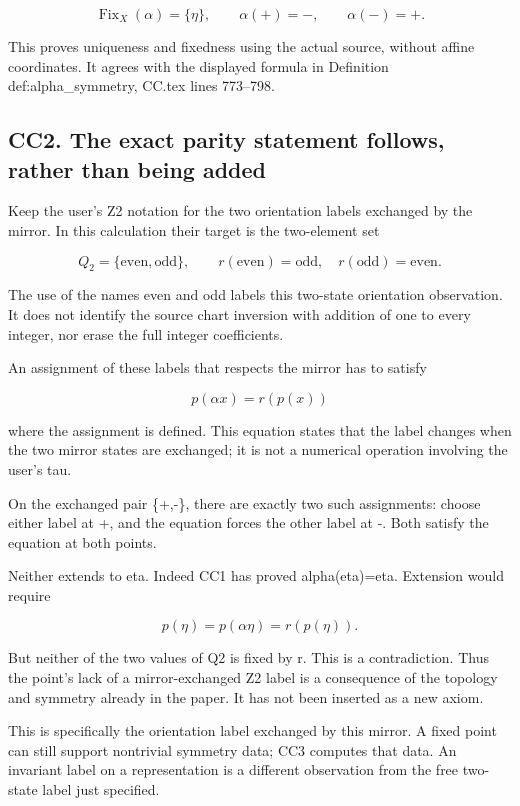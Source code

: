 \documentclass[
  11pt,
]{article}
\begin{document}
\[
\operatorname{Fix}_X(\alpha)=\{\eta\},\qquad
\alpha(+)= -,\qquad\alpha(-)= +.
\]

This proves uniqueness and fixedness using the actual source, without
affine coordinates. It agrees with the displayed formula in Definition
def:alpha\_symmetry, CC.tex lines 773--798.

\subsection{CC2. The exact parity statement follows, rather than being
added}\label{cc2.-the-exact-parity-statement-follows-rather-than-being-added}

Keep the user's Z2 notation for the two orientation labels exchanged by
the mirror. In this calculation their target is the two-element set

\[
Q_2=\{\mathrm{even},\mathrm{odd}\},\qquad
r(\mathrm{even})=\mathrm{odd},\quad
r(\mathrm{odd})=\mathrm{even}.
\]

The use of the names even and odd labels this two-state orientation
observation. It does not identify the source chart inversion with
addition of one to every integer, nor erase the full integer
coefficients.

An assignment of these labels that respects the mirror has to satisfy

\[
p(\alpha x)=r(p(x))
\]

where the assignment is defined. This equation states that the label
changes when the two mirror states are exchanged; it is not a numerical
operation involving the user's tau.

On the exchanged pair \{+,-\}, there are exactly two such assignments:
choose either label at +, and the equation forces the other label at -.
Both satisfy the equation at both points.

Neither extends to eta. Indeed CC1 has proved alpha(eta)=eta. Extension
would require

\[
p(\eta)=p(\alpha\eta)=r(p(\eta)).
\]

But neither of the two values of Q2 is fixed by r. This is a
contradiction. Thus the point's lack of a mirror-exchanged Z2 label is a
consequence of the topology and symmetry already in the paper. It has
not been inserted as a new axiom.

This is specifically the orientation label exchanged by this mirror. A
fixed point can still support nontrivial symmetry data; CC3 computes
that data. An invariant label on a representation is a different
observation from the free two-state label just specified.
\end{document}
